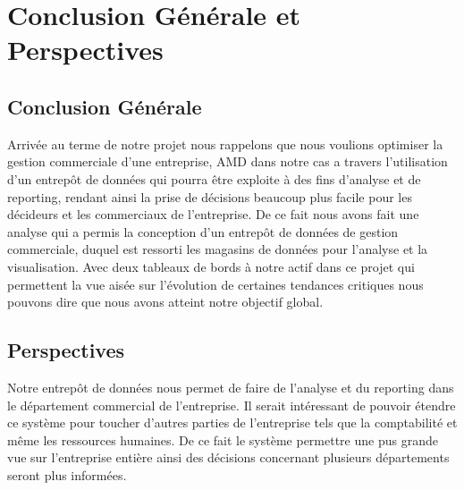 \chapter*{Conclusion Générale et Perspectives}%
%

\section*{Conclusion Générale}
%

Arrivée au terme de notre projet nous rappelons que nous voulions optimiser la gestion commerciale d’une entreprise, AMD dans notre cas a travers l’utilisation d’un entrepôt de données qui pourra être exploite à des fins d’analyse et de reporting, rendant ainsi la prise de décisions beaucoup plus facile pour les décideurs et les commerciaux de l’entreprise. De ce fait nous avons fait une analyse qui a permis la conception d’un entrepôt de données de gestion commerciale, duquel est ressorti les magasins de données pour l’analyse et la visualisation. Avec deux tableaux de bords à notre actif dans ce projet qui permettent la vue aisée sur l’évolution de certaines tendances critiques nous pouvons dire que nous avons atteint notre objectif global.

\section*{Perspectives}
%

Notre entrepôt de données nous permet de faire de l’analyse et du reporting dans le département commercial de l’entreprise. Il serait intéressant de pouvoir étendre ce système pour toucher d’autres parties de l’entreprise tels que la comptabilité et même les ressources humaines. De ce fait le système permettre une pus grande vue sur l’entreprise entière ainsi des décisions concernant plusieurs départements seront plus informées. 
